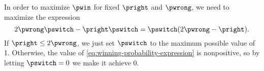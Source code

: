 In order to maximize $\pwin$ for fixed $\pright$ and $\pwrong$, we need to maximize the expression
\begin{equation} \label{eq:winning-probability-expression}
    2\pwrong\pswitch-\pright\pswitch = \pswitch(2\pwrong-\pright).
\end{equation}
If $\pright\le2\pwrong$, we just set $\pswitch$ to the maximum possible value of 1.
Otherwise, the value of \eqref{eq:winning-probability-expression} is nonpositive, so by letting $\pswitch=0$ we make it achieve 0.
